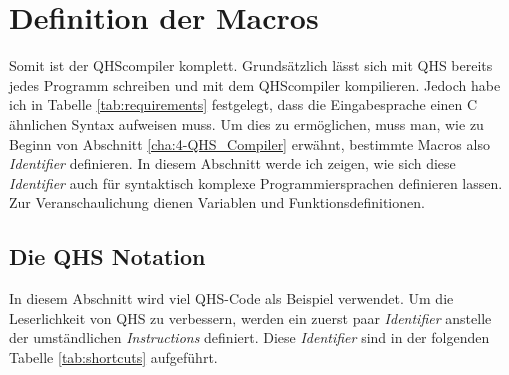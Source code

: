 \section{Definition der Macros} \label{sec:qhs-macro_definitions}
Somit ist der QHScompiler komplett. Grundsätzlich lässt sich mit QHS bereits jedes Programm schreiben und mit dem QHScompiler kompilieren. 
Jedoch habe ich in Tabelle \ref{tab:requirements} festgelegt, dass die Eingabesprache einen C ähnlichen Syntax aufweisen muss.
Um dies zu ermöglichen, muss man, wie zu Beginn von Abschnitt \ref{cha:4-QHS_Compiler} erwähnt, bestimmte Macros also \textit{Identifier} definieren.
In diesem Abschnitt werde ich zeigen, wie sich diese \textit{Identifier} auch für syntaktisch komplexe Programmiersprachen definieren lassen.
Zur Veranschaulichung dienen Variablen und Funktionsdefinitionen.

\subsection{Die QHS Notation} \label{sec:qhs-notation}
In diesem Abschnitt wird viel QHS-Code als Beispiel verwendet.
Um die Leserlichkeit von QHS zu verbessern, werden ein zuerst paar \textit{Identifier} anstelle der umständlichen \textit{Instructions} definiert.
Diese \textit{Identifier} sind in der folgenden Tabelle \ref{tab:shortcuts} aufgeführt.

